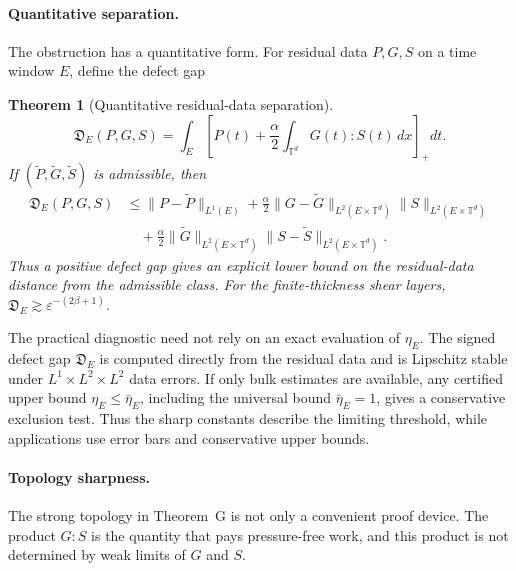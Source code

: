 \documentclass[11pt]{article}
\numberwithin{equation}{section}
\newtheorem{maintheorem}{Theorem}
\begin{document}
\paragraph{Quantitative separation.}

The obstruction has a quantitative form.  For residual data \(P,G,S\) on a time
window \(E\), define the defect gap
\begin{maintheorem}[Quantitative residual-data separation]
\label{thm:intro-quantitative-gap}
\[
  \mathfrak D_E(P,G,S)
  =
  \int_E
  \left[
  P(t)+\frac{\alpha}{2}
  \int_{\mathbb T^d}G(t):S(t)\,dx
  \right]_+dt .
\]
If \((\widetilde P,\widetilde G,\widetilde S)\) is admissible, then
\[
\begin{aligned}
  \mathfrak D_E(P,G,S)
  &\le
  \|P-\widetilde P\|_{L^1(E)}
  +\frac{\alpha}{2}
   \|G-\widetilde G\|_{L^2(E\times\mathbb T^d)}
   \|S\|_{L^2(E\times\mathbb T^d)}\\
  &\quad
  +\frac{\alpha}{2}
   \|\widetilde G\|_{L^2(E\times\mathbb T^d)}
   \|S-\widetilde S\|_{L^2(E\times\mathbb T^d)} .
\end{aligned}
\]
Thus a positive defect gap gives an explicit lower bound on the residual-data
distance from the admissible class.  For the finite-thickness shear layers,
\(\mathfrak D_E\gtrsim\varepsilon^{-(2\beta+1)}\).
\end{maintheorem}

The practical diagnostic need not rely on an exact evaluation of
\(\eta_E\).  The signed defect gap \(\mathfrak D_E\) is computed directly from
the residual data and is Lipschitz stable under \(L^1\times L^2\times L^2\)
data errors.  If only bulk estimates are available, any certified upper bound
\(\eta_E\le\bar\eta_E\), including the universal bound \(\bar\eta_E=1\), gives
a conservative exclusion test.  Thus the sharp constants describe the limiting
threshold, while applications use error bars and conservative upper bounds.

\paragraph{Topology sharpness.}

The strong topology in Theorem~G is not only a convenient proof device.  The
product \(G:S\) is the quantity that pays pressure-free work, and this product
is not determined by weak limits of \(G\) and \(S\).
\end{document}
